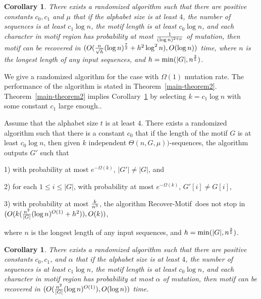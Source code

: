 \documentclass[11pt]{article}
\newtheorem{corollaryfoo}[theoremfoo]{Corollary}
\newenvironment{corollary}{\pagebreak[1]\begin{corollaryfoo}}{\end{corollaryfoo}}
\newcommand{\algmnam}{Recover-Motif}
\begin{document}
\begin{corollary}\label{corollary1}
There exists a randomized algorithm such that there are positive
constants $c_0, c_1$ and $\mu$ that if the alphabet size is at least
$4$, the number of sequences is at least $c_1\log n$, the motif
length is at least $c_0\log n$, and each character in motif region
has probability at most ${1\over (\log n)^{2+\mu}}$ of mutation,
then motif can be recovered in $(O({n\over \sqrt{h}}(\log n)^{7\over
2}+h^2\log^2 n), O(\log n))$ time, where $n$ is the longest length
of any input sequences, and $h=\min(|G|,n^{2\over 5})$.
\end{corollary}

We give a randomized algorithm for the case with $\Omega(1)$
mutation rate. The performance of the algorithm is stated in
Theorem~\ref{main-theorem2}. Theorem~\ref{main-theorem2} implies
Corollary~\ref{corollary2} by selecting $k=c_1\log n$ with some
constant $c_1$ large enough..

\begin{theorem}\label{main-theorem2}Assume that the alphabet size $t$ is at least $4$. There
exists a randomized algorithm such that there is a constant $c_0$
that
 if the length of the motif $G$ is at least $c_0\log n$,
then given $k$ independent $\Theta(n,G,\mu))$-sequences, the
algorithm
 outputs
$G'$ such that

1) with probability at most $e^{-\Omega(k)}$, $|G'|\not=|G|$, and

2) for each $1\le i\le |G|$, with probability at most
$e^{-\Omega(k)}$, $G'[i]\not=G[i]$,

3)  with probability at most ${k\over n^3}$, the algorithm
\algmnam~does not stop in $(O(k({n^2\over |G|}(\log n)^{O(1)}+h^2)),
O(k))$,

 where $n$ is the longest length of any input
sequences, and $h=\min(|G|,n^{2\over 5})$.
\end{theorem}


\begin{corollary}\label{corollary2}
There exists a randomized algorithm such that there are positive
constants $c_0, c_1$, and $\alpha$ that if the alphabet size is at
least $4$, the number of sequences is at least $c_1\log n$, the
motif length is at least $c_0\log n$, and each character in motif
region has probability at most $\alpha$ of mutation, then motif can
be recovered in $(O({n^2\over |G|}(\log n)^{O(1)}), O(\log n))$
time.
\end{corollary}
\end{document}
